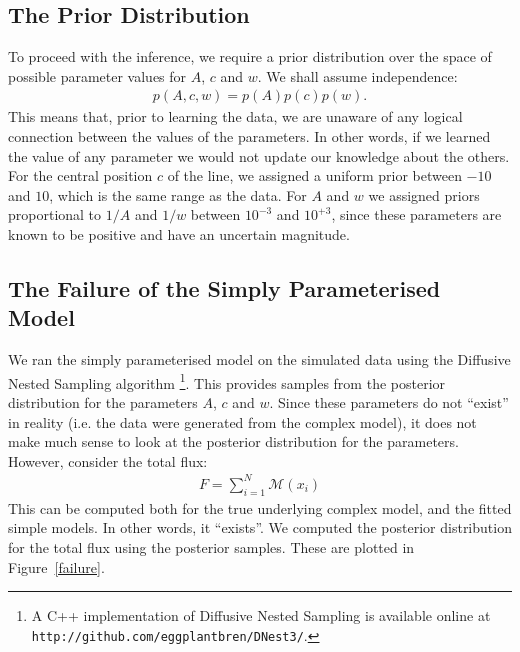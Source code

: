 \documentclass[letterpaper, 11pt]{article}
\begin{document}
\subsection{The Prior Distribution}
To proceed with the inference, we require a prior distribution over the space
of possible parameter values for $A$, $c$ and $w$. We shall assume independence:
\begin{eqnarray}
p(A, c, w) = p(A)p(c)p(w).
\end{eqnarray}
This means that, prior to learning the data, we are unaware of any logical
connection between the values of the parameters. In other words, if we learned the
value of any parameter we would not update our knowledge about the others.
For the central position $c$ of the line, we assigned a uniform prior between
$-10$ and $10$, which is the same range as the data. For $A$ and $w$ we assigned
priors proportional to $1/A$ and $1/w$ between $10^{-3}$ and $10^{+3}$, since these
parameters are known to be positive and have an uncertain magnitude.

\subsection{The Failure of the Simply Parameterised Model}
We ran the simply parameterised model on the simulated data using the Diffusive
Nested Sampling algorithm \citep{dnest}
\footnote{A C++ implementation of Diffusive Nested Sampling is available
online at {\tt http://github.com/eggplantbren/DNest3/}.}. This provides samples
from the posterior distribution for the parameters $A$, $c$ and $w$. Since these
parameters do not ``exist'' in reality (i.e. the data were generated from the
complex model), it does not make much sense to look at the posterior distribution
for the parameters. However, consider the total flux:
\begin{eqnarray}
F = \sum_{i=1}^N \mathcal{M}(x_i)
\end{eqnarray}
This can be computed both for the true underlying complex model, and the fitted
simple models. In other words, it ``exists''. We computed the posterior distribution
for the total flux using the posterior samples. These are plotted in
Figure~\ref{failure}.
\end{document}
